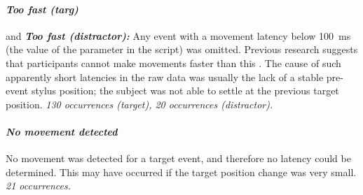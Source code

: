\documentclass[11pt, a4paper]{article}
\begin{document}
%

%

\paragraph{\emph{Too fast (targ)}} and {\bf \emph{Too fast (distractor):}}
Any event with a movement latency below 100~ms (the value of the
parameter  in the
 script) was omitted. Previous research
suggests that participants cannot make movements faster than this
\cite{gielen_coordination_1984,prablanc_optimal_1979}. The cause of
such apparently short latencies in the raw data was usually the lack of
a stable pre-event stylus position; the subject was not able to settle
at the previous target position. \emph{130 occurrences (target), 20
  occurrences (distractor).}

\paragraph{\emph{No movement detected}}

No movement was detected for a target event, and therefore no latency
could be determined. This may have occurred if the target position
change was very small. \emph{21 occurrences.}

\end{document}
